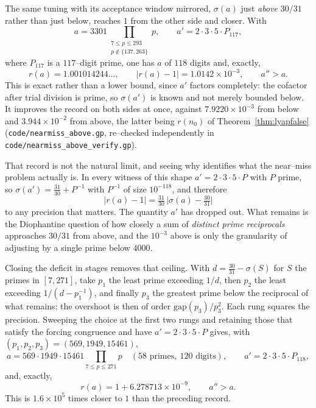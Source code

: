 \documentclass[11pt]{article}
\theoremstyle{definition}
\begin{document}
The same tuning with its acceptance window mirrored, $\sigma(a)$ just \emph{above} $30/31$ rather than
just below, reaches $1$ from the other side and closer. With
\[ a=3301\!\!\prod_{\substack{7\le p\le293\\ p\notin\{137,263\}}}\!\!p, \qquad
   a'=2\cdot3\cdot5\cdot P_{117}, \]
where $P_{117}$ is a $117$--digit prime, one has $a$ of $118$ digits and, exactly,
\[ r(a)=1.001014244\ldots,\qquad |r(a)-1|=1.0142\times10^{-3},\qquad a''>a. \]
This is exact rather than a lower bound, since $a'$ factors completely: the cofactor after trial
division is prime, so $\sigma(a')$ is known and not merely bounded below. It improves the record on
both sides at once, against $7.9220\times10^{-3}$ from below and $3.944\times10^{-2}$ from above,
the latter being $r(n_0)$ of Theorem~\ref{thm:lyapfalse}
\textup{(\texttt{code/nearmiss\_above.gp}, re--checked independently in
\texttt{code/nearmiss\_above\_verify.gp})}.

That record is not the natural limit, and seeing why identifies what the near--miss problem actually
is. In every witness of this shape $a'=2\cdot3\cdot5\cdot P$ with $P$ prime, so
$\sigma(a')=\tfrac{31}{30}+P^{-1}$ with $P^{-1}$ of size $10^{-118}$, and therefore
\[ |r(a)-1|=\tfrac{31}{30}\,\bigl|\sigma(a)-\tfrac{30}{31}\bigr| \]
to any precision that matters. The quantity $a'$ has dropped out. What remains is the Diophantine
question of how closely a sum of \emph{distinct prime reciprocals} approaches $30/31$ from above, and
the $10^{-3}$ above is only the granularity of adjusting by a single prime below $4000$.

Closing the deficit in stages removes that ceiling. With $d=\tfrac{30}{31}-\sigma(S)$ for
$S$ the primes in $[7,271]$, take $p_1$ the least prime exceeding $1/d$, then $p_2$ the least
exceeding $1/(d-p_1^{-1})$, and finally $p_3$ the greatest prime below the reciprocal of what
remains; the overshoot is then of order $\mathrm{gap}(p_3)/p_3^{2}$. Each rung squares the precision.
Sweeping the choice at the first two rungs and retaining those that satisfy the forcing congruence
and have $a'=2\cdot3\cdot5\cdot P$ gives, with
$(p_1,p_2,p_3)=(569,1949,15461)$,
\[ a=569\cdot1949\cdot15461\!\!\prod_{7\le p\le271}\!\!p \quad(58\text{ primes},\ 120\text{ digits}),
   \qquad a'=2\cdot3\cdot5\cdot P_{118}, \]
and, exactly,
\[ r(a)=1+6.278713\times10^{-9},\qquad a''>a. \]
This is $1.6\times10^{5}$ times closer to $1$ than the preceding record.
\end{document}
